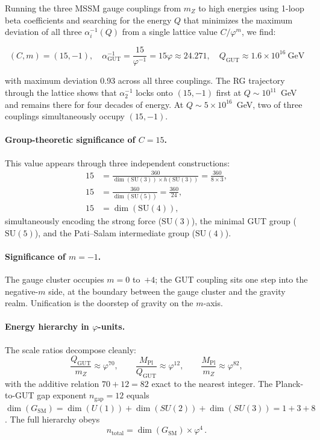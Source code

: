 \documentclass[12pt,a4paper]{article}
\newcommand{\vp}{\varphi}
\newcommand{\aGUT}{\alpha_{\mathrm{GUT}}}
\newcommand{\MPl}{M_{\mathrm{Pl}}}
\newcommand{\mZ}{m_Z}
\newcommand{\QGUT}{Q_{\mathrm{GUT}}}
\newcommand{\SM}{\mathrm{SM}}
\begin{document}
Running the three MSSM gauge couplings from $\mZ$ to high energies using
1-loop beta coefficients and searching for the energy $Q$ that minimizes the
maximum deviation of all three $\alpha_i^{-1}(Q)$ from a single lattice value
$C/\vp^m$, we find:

\begin{equation}
\boxed{(C, m) = (15, -1), \quad
\aGUT^{-1} = \frac{15}{\vp^{-1}} = 15\vp \approx 24.271, \quad
\QGUT \approx 1.6 \times 10^{16}~\text{GeV}}
\label{eq:gut}
\end{equation}

with maximum deviation 0.93 across all three couplings.  The RG trajectory
through the lattice shows that $\alpha_2^{-1}$ locks onto $(15, -1)$ first at
$Q \sim 10^{11}$~GeV and remains there for four decades of energy.  At
$Q \sim 5\times 10^{16}$~GeV, two of three couplings simultaneously occupy
$(15, -1)$.

\paragraph{Group-theoretic significance of $C = 15$.}  This value appears
through three independent constructions:
\begin{align}
  15 &= \frac{360}{\dim(\mathrm{SU}(3)) \times h(\mathrm{SU}(3))}
     = \frac{360}{8 \times 3}, \label{eq:c15_su3} \\
  15 &= \frac{360}{\dim(\mathrm{SU}(5))}
     = \frac{360}{24}, \label{eq:c15_su5} \\
  15 &= \dim(\mathrm{SU}(4)), \label{eq:c15_su4}
\end{align}
simultaneously encoding the strong force ($\mathrm{SU}(3)$), the minimal GUT
group ($\mathrm{SU}(5)$), and the Pati--Salam intermediate group
($\mathrm{SU}(4)$).

\paragraph{Significance of $m = -1$.}  The gauge cluster occupies
$m = 0$ to~$+4$; the GUT coupling sits one step into the negative-$m$ side,
at the boundary between the gauge cluster and the gravity realm.  Unification
is the doorstep of gravity on the $m$-axis.

\paragraph{Energy hierarchy in $\vp$-units.}  The scale ratios decompose
cleanly:
\begin{equation}
  \frac{\QGUT}{\mZ} \approx \vp^{70}, \qquad
  \frac{\MPl}{\QGUT} \approx \vp^{12}, \qquad
  \frac{\MPl}{\mZ} \approx \vp^{82},
  \label{eq:hierarchy}
\end{equation}
with the additive relation $70 + 12 = 82$ exact to the nearest integer.  The
Planck-to-GUT gap exponent $n_{\mathrm{gap}} = 12$ equals
$\dim(G_{\SM}) = \dim(U(1)) + \dim(SU(2)) + \dim(SU(3)) = 1 + 3 + 8$.  The
full hierarchy obeys
\begin{equation}
  n_{\mathrm{total}} = \dim(G_{\SM}) \times \vp^4\,.
\end{equation}
\end{document}
